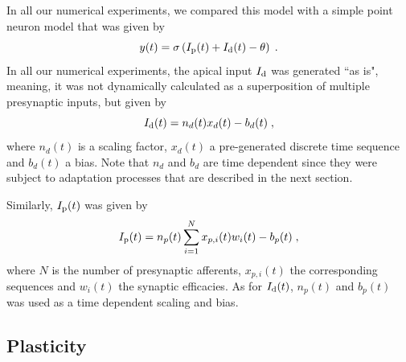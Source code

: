 \documentclass[10pt,a4paper,twocolumn]{article}
\begin{document}
		In all our numerical experiments, we compared this model with a 
		simple point neuron model that was given by
		\begin{equation}
			y(t) = \sigma\left(I_{\rm p}(t) + I_{\rm d}(t) - \theta \right) \; .
		\end{equation}
		In all our numerical experiments, the apical input $I_{\rm d}$ was generated
		``as is", meaning, it was not dynamically calculated as a superposition
		of multiple presynaptic inputs, but given by
		\begin{equation}
			I_{\rm d}(t) = n_d(t) x_d(t) - b_d(t) \; ,
			\label{eq:I_d}
		\end{equation}
		where $n_d(t)$ is a scaling factor, $x_d(t)$ a pre-generated
		discrete time sequence and $b_d(t)$ a bias. Note that $n_d$ and $b_d$ 
		are time dependent since they were subject to adaptation processes 
		that are described in the next section.
		
		Similarly, $I_{\rm p}(t)$ was given by
		\begin{equation}
			I_{\rm p}(t) = n_p(t) \sum_{i=1}^{N} x_{p,i}(t) w_i(t) - b_p(t) \; ,
		\end{equation}
		where $N$ is the number of presynaptic afferents, $x_{p,i}(t)$ the
		corresponding sequences and $w_i(t)$ the synaptic efficacies.
		As for $I_{\rm d}(t)$, $n_p(t)$ and $b_p(t)$ was used as a time dependent
		scaling and bias.
		
		\subsection{Plasticity}
		
\end{document}
